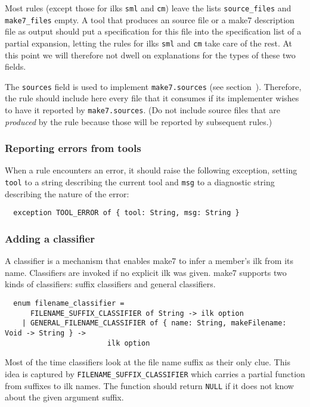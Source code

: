 Most rules (except those for ilks {\tt sml} and {\tt cm}) leave the
lists {\tt source_files} and {\tt make7_files} empty.  A tool that produces an
source file or a make7 description file as output should put a
specification for this file into the specification list of a partial
expansion, letting the rules for ilks {\tt sml} and {\tt cm} take
care of the rest.  At this point we will therefore not dwell on
explanations for the types of these two fields.

The {\tt sources} field is used to implement {\tt make7.sources} (see
section~).  Therefore, the rule should
include here every file that it consumes if its implementer wishes to
have it reported by {\tt make7.sources}.  (Do not include source files
that are {\em produced} by the rule because those will be reported by
subsequent rules.)

\subsubsection{Reporting errors from tools}

When a rule encounters an error, it should raise the following
exception, setting {\tt tool} to a string describing the current tool
and {\tt msg} to a diagnostic string describing the nature of the
error:

\begin{verbatim}
  exception TOOL_ERROR of { tool: String, msg: String }
\end{verbatim}

\subsubsection{Adding a classifier}

A classifier is a mechanism that enables make7 to infer a member's ilk
from its name.  Classifiers are invoked if no explicit ilk was
given.  make7 supports two kinds of classifiers: suffix classifiers and
general classifiers.

\begin{verbatim}
  enum filename_classifier =
      FILENAME_SUFFIX_CLASSIFIER of String -> ilk option
    | GENERAL_FILENAME_CLASSIFIER of { name: String, makeFilename: Void -> String } ->
                        ilk option
\end{verbatim}

Most of the time classifiers look at the file name suffix as their only
clue.  This idea is captured by {\tt FILENAME\_SUFFIX\_CLASSIFIER} which carries a
partial function from suffixes to ilk names.  The function should
return {\tt NULL} if it does not know about the given argument suffix.

